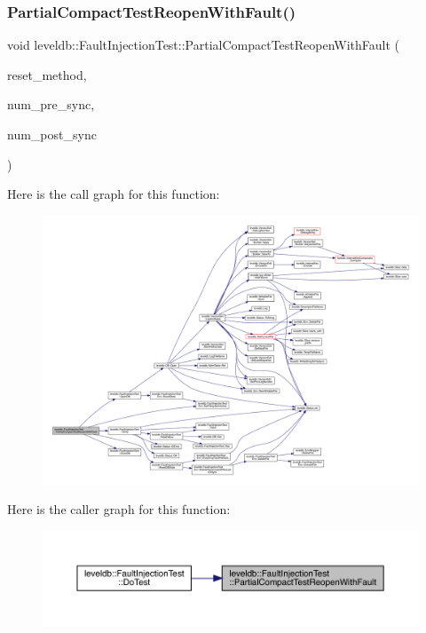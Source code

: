 \subsubsection{\texorpdfstring{PartialCompactTestReopenWithFault()}{PartialCompactTestReopenWithFault()}}
{\footnotesize\ttfamily void leveldb\+::\+Fault\+Injection\+Test\+::\+Partial\+Compact\+Test\+Reopen\+With\+Fault (\begin{DoxyParamCaption}\item[{\mbox{\hyperlink{classleveldb_1_1_fault_injection_test_a316891ca042a42e0d26ec45450828cc3}{Reset\+Method}}}]{reset\+\_\+method,  }\item[{int}]{num\+\_\+pre\+\_\+sync,  }\item[{int}]{num\+\_\+post\+\_\+sync }\end{DoxyParamCaption})\hspace{0.3cm}{\ttfamily [inline]}}

Here is the call graph for this function\+:
\nopagebreak
\begin{figure}[H]
\begin{center}
\leavevmode
\includegraphics[width=350pt]{classleveldb_1_1_fault_injection_test_aba1c6ef251ae09ce32acb3a16e2c0004_cgraph}
\end{center}
\end{figure}
Here is the caller graph for this function\+:
\nopagebreak
\begin{figure}[H]
\begin{center}
\leavevmode
\includegraphics[width=350pt]{classleveldb_1_1_fault_injection_test_aba1c6ef251ae09ce32acb3a16e2c0004_icgraph}
\end{center}
\end{figure}
\mbox{\label{classleveldb_1_1_fault_injection_test_a0b40c46d524ef4ddd2415039e7f100a4}} 
